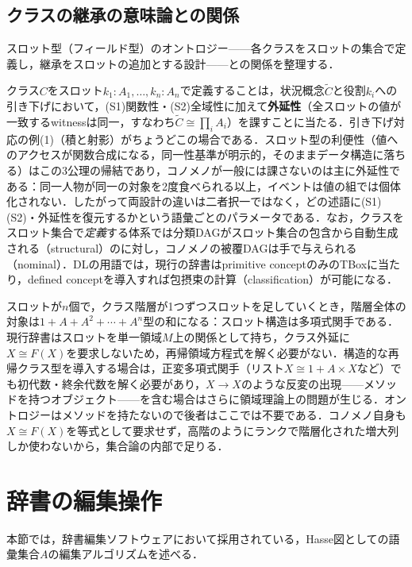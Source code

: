 \documentclass[../../main-detail.tex]{subfiles}
\begin{document}
\subsection{クラスの継承の意味論との関係}
スロット型（フィールド型）のオントロジー——各クラスをスロットの集合で定義し，継承をスロットの追加とする設計——との関係を整理する．
\begin{remark}[スロット型は引き下げの特殊例である]
    クラス$C$をスロット$k_1 : A_1, \dots, k_n : A_n$で定義することは，状況概念$\tilde C$と役割$k_i$への引き下げにおいて，(S1)関数性・(S2)全域性に加えて\textbf{外延性}（全スロットの値が一致するwitnessは同一，すなわち$\tilde C \cong \prod_i A_i$）を課すことに当たる．引き下げ対応の例(1)（積と射影）がちょうどこの場合である．スロット型の利便性（値へのアクセスが関数合成になる，同一性基準が明示的，そのままデータ構造に落ちる）はこの3公理の帰結であり，コノメノが一般には課さないのは主に外延性である：同一人物が同一の対象を2度食べられる以上，イベントは値の組では個体化されない．したがって両設計の違いは二者択一ではなく，どの述語に(S1)(S2)・外延性を復元するかという語彙ごとのパラメータである．なお，クラスをスロット集合で\emph{定義}する体系では分類DAGがスロット集合の包含から自動生成される（structural）のに対し，コノメノの被覆DAGは手で与えられる（nominal）．DLの用語では，現行の辞書はprimitive conceptのみのTBoxに当たり，defined conceptを導入すれば包摂束の計算（classification）が可能になる\cite{dl-handbook}．
\end{remark}
\begin{remark}[再帰領域方程式は不要である]
    スロットが$n$個で，クラス階層が1つずつスロットを足していくとき，階層全体の対象は$1 + A + A^2 + \cdots + A^n$型の和になる：スロット構造は多項式関手である．現行辞書はスロットを単一領域$M$上の関係として持ち，クラス外延に$X \cong F(X)$を要求しないため，再帰領域方程式を解く必要がない．構造的な再帰クラス型を導入する場合は，正変多項式関手（リスト$X \cong 1 + A \times X$など）でも初代数・終余代数を解く必要があり，$X \to X$のような反変の出現——メソッドを持つオブジェクト——を含む場合はさらに領域理論上の問題が生じる．オントロジーはメソッドを持たないので後者はここでは不要である．コノメノ自身も$X \cong F(X)$を等式として要求せず，高階のようにランクで階層化された増大列しか使わないから，集合論の内部で足りる．
\end{remark}

\section{辞書の編集操作}
本節では，辞書編集ソフトウェアにおいて採用されている，Hasse図としての語彙集合$A$の編集アルゴリズムを述べる．
\end{document}
